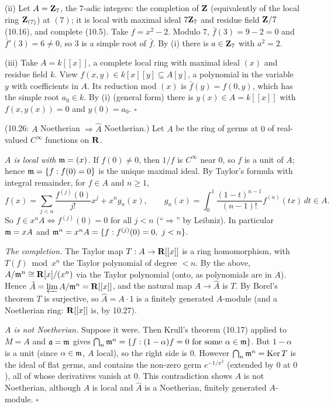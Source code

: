 \documentclass[11pt]{article}
\begin{document}
(ii) Let $A=\mathbf Z_7$, the $7$-adic integers: the completion of $\mathbf Z$ (equivalently of the local ring $\mathbf Z_{(7)}$) at $(7)$; it is local with maximal ideal $7\mathbf Z_7$ and residue field $\mathbf Z/7$ (10.16), and complete (10.5). Take $f=x^2-2$. Modulo $7$, $\bar f(3)=9-2=0$ and $\bar f'(3)=6\ne0$, so $3$ is a simple root of $\bar f$. By (i) there is $a\in\mathbf Z_7$ with $a^2=2$.

(iii) Take $A=k[[x]]$, a complete local ring with maximal ideal $(x)$ and residue field $k$. View $f(x,y)\in k[x][y]\subseteq A[y]$, a polynomial in the variable $y$ with coefficients in $A$. Its reduction mod $(x)$ is $\bar f(y)=f(0,y)$, which has the simple root $a_0\in k$. By (i) (general form) there is $y(x)\in A=k[[x]]$ with $f(x,y(x))=0$ and $y(0)=a_0$. \hfill$\square$

\pf
(10.26: $A$ Noetherian $\Rightarrow\hat A$ Noetherian.) Let $A$ be the ring of germs at $0$ of real-valued $C^\infty$ functions on $\mathbf R$.

\emph{$A$ is local with $\mathfrak m=(x)$.} If $f(0)\ne0$, then $1/f$ is $C^\infty$ near $0$, so $f$ is a unit of $A$; hence $\mathfrak m=\{f:f(0)=0\}$ is the unique maximal ideal. By Taylor's formula with integral remainder, for $f\in A$ and $n\ge1$,
\[
f(x)=\sum_{j<n}\frac{f^{(j)}(0)}{j!}x^j+x^ng_n(x),\qquad g_n(x)=\int_0^1\frac{(1-t)^{n-1}}{(n-1)!}f^{(n)}(tx)\,dt\in A.
\]
So $f\in x^nA\iff f^{(j)}(0)=0$ for all $j<n$ (``$\Rightarrow$'' by Leibniz). In particular $\mathfrak m=xA$ and $\fm^n=x^nA=\{f:f^{(j)}(0)=0,\ j<n\}$.

\emph{The completion.} The Taylor map $T:A\to\mathbf R[[x]]$ is a ring homomorphism, with $T(f)\bmod x^n$ the Taylor polynomial of degree $<n$. By the above, $A/\mathfrak m^n\cong\mathbf R[x]/(x^n)$ via the Taylor polynomial (onto, as polynomials are in $A$). Hence $\hat A=\varprojlim A/\mathfrak m^n=\mathbf R[[x]]$, and the natural map $A\to\hat A$ is $T$. By Borel's theorem $T$ is surjective, so $\hat A=A\cdot1$ is a finitely generated $A$-module (and a Noetherian ring: $\mathbf R[[x]]$ is, by 10.27).

\emph{$A$ is not Noetherian.} Suppose it were. Then Krull's theorem (10.17) applied to $M=A$ and $\mathfrak a=\mathfrak m$ gives $\bigcap_n\mathfrak m^n=\{f:(1-\alpha)f=0\text{ for some }\alpha\in\mathfrak m\}$. But $1-\alpha$ is a unit (since $\alpha\in\mathfrak m$, $A$ local), so the right side is $0$. However $\bigcap_n\mathfrak m^n=\operatorname{Ker} T$ is the ideal of flat germs, and contains the non-zero germ $e^{-1/x^2}$ (extended by $0$ at $0$), all of whose derivatives vanish at $0$. This contradiction shows $A$ is not Noetherian, although $A$ is local and $\hat A$ is a Noetherian, finitely generated $A$-module. \hfill$\square$
\end{document}
